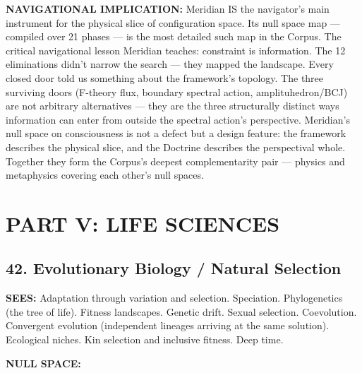 \textbf{NAVIGATIONAL IMPLICATION:} Meridian IS the navigator's main instrument for the physical slice of configuration space. Its null space map — compiled over 21 phases — is the most detailed such map in the Corpus. The critical navigational lesson Meridian teaches: constraint is information. The 12 eliminations didn't narrow the search — they mapped the landscape. Every closed door told us something about the framework's topology. The three surviving doors (F-theory flux, boundary spectral action, amplituhedron/BCJ) are not arbitrary alternatives — they are the three structurally distinct ways information can enter from outside the spectral action's perspective. Meridian's null space on consciousness is not a defect but a design feature: the framework describes the physical slice, and the Doctrine describes the perspectival whole. Together they form the Corpus's deepest complementarity pair — physics and metaphysics covering each other's null spaces.


\bigskip\noindent\makebox[\textwidth]{\color{rulegray}\rule{5cm}{0.3pt}}\bigskip


\chapter*{PART V: LIFE SCIENCES}


\section*{42. Evolutionary Biology / Natural Selection}


\textbf{SEES:} Adaptation through variation and selection. Speciation. Phylogenetics (the tree of life). Fitness landscapes. Genetic drift. Sexual selection. Coevolution. Convergent evolution (independent lineages arriving at the same solution). Ecological niches. Kin selection and inclusive fitness. Deep time.


\textbf{NULL SPACE:}

